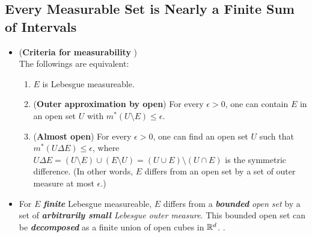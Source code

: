 \documentclass[11pt]{article}
\begin{document}
\subsection{Every Measurable Set is Nearly a Finite Sum of Intervals}
\begin{itemize}
\item 
 \begin{proposition} (\textbf{Criteria for measurability} \citep{tao2011introduction})\\
The followings are equivalent:
\begin{enumerate}
\item $E$ is Lebesgue measureable.
\item (\textbf{Outer approximation by open}) For every $\epsilon>0$, one can contain $E$ in an open set $U$ with $m^{*}(U \setminus E)\le \epsilon $.
\item (\textbf{Almost open}) For every $\epsilon>0$, one can find an open set $U$ such that  $m^{*}(U\Delta E)\le \epsilon $, where $U\Delta E = (U  \setminus E)\cup (E  \setminus U) = (U\cup E)  \setminus (U\cap E)$ is the symmetric difference. (In other words, $E$ differs from an open set by a set of outer measure at most $\epsilon$.) 
\end{enumerate}
\end{proposition}

\item \begin{remark}
For $E$ \emph{\textbf{finite}} Lebesgue measureable, $E$ differs from a \emph{\textbf{bounded}} \emph{open set} by a set of \emph{\textbf{arbitrarily small} Lebesgue outer measure}. This bounded open set can be \emph{\textbf{decomposed}} as a finite union of open cubes in ${\mathbb R}^{d}$. \citep{royden1988real}.
\end{remark}
\end{itemize}
\end{document}
